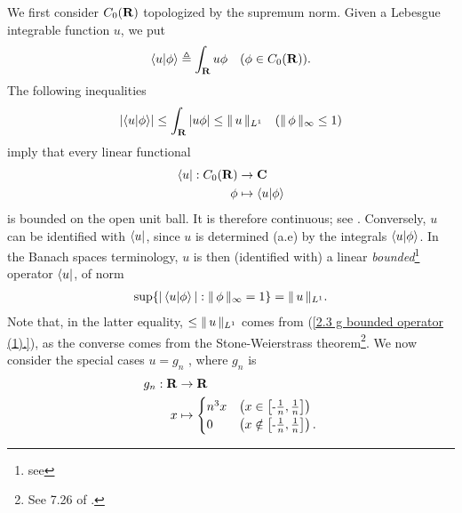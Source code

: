 We first consider %
%
  $C_0(\R)$ %
%
topologized by the supremum norm. %
Given a Lebesgue integrable function $u$, we put %
  \begin{align}
    \bra{u}\ket{\phi} 
      \Def 
    \int_\R u\phi  
      \quad(\phi \in C_0(\R)).
  \end{align}
%
The following inequalities %
%
  \begin{align}\label{2.3  g  bounded operator (1).}
    \left\lvert\bra{u}\ket{\phi}\right\rvert 
      \leq 
    \int_\R \left\lvert u\phi \right\rvert 
      \leq
    \norm{L^1}{u}
      \quad(\norm{\infty}{\phi} \leq 1)
  \end{align} 
%
imply that every linear functional 
%
  \begin{align}
    \bra{u}: C_0(\R) &\to \C \\
             \phi    &\mapsto \bra{u}\ket{\phi} \nonumber
  \end{align}
%
is bounded on the open unit ball. It is therefore continuous; %
%
  see . %
%
Conversely, ${u}$ can be identified with %
%
  $\bra{u}$, %
%
since $u$ is determined (a.e) by the integrals %
%
  $\bra{u}\ket{\phi}$. %
%
In the Banach spaces terminology, 
% 
  $u$ is then (identified with) a linear \textit{bounded}\hspace{2pt}\footnote{
    see 
  } %
operator $\bra{u}$, of norm %
%
  \begin{align}\label{2.3  g  bounded operator (2).}
    \sup\set{
      \magnitude{\bra{u}\ket{\phi}}
    }{ 
      \norm{\infty}{\phi} = 1
    } 
    =  \norm{L^1}{u}.
  \end{align} 
%
Note that, in the latter equality, $\leq \norm{L^1}{u}$ comes from %
%
  (\ref{2.3  g  bounded operator (1).}), %
%
as the converse comes from the Stone-Weierstrass theorem\footnote{
%
  See 7.26 of \cite{BabyRudin}.
}. %
%
We now consider the special cases %
%
  $u = g_n$ %
%
, where $g_n$ is %
%
  \begin{align}
    g_n : \R & \to \R\\
           x & \mapsto \begin{cases} 
  n^3 x & \left(x \in    \left[\minus \frac{1}{n}, \frac{1}{n}\right]\right)\\
  0     & \left(x \notin \left[\minus \frac{1}{n}, \frac{1}{n}\right]\right).
  \end{cases}\nonumber
  \end{align}
